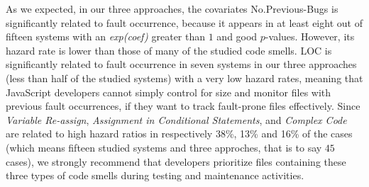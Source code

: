 As we expected, {\color{blue}in our three approaches,} the covariates No.Previous-Bugs is significantly related to fault occurrence, {\color{blue}because it appears in at least eight out of fifteen systems with an \textsl{exp(coef)} greater than $1$ and good $p$-values. However, its hazard rate is lower than those of many of the studied code smells. LOC is significantly related to fault occurrence in seven systems in our three approaches (less than half of the studied systems) with a very low hazard rates,} meaning that JavaScript developers cannot simply control for size and monitor files with previous fault occurrences, if they want to track fault-prone files effectively. Since \textsl{Variable Re-assign}, {\color{blue}\textsl{Assignment in Conditional Statements}, and \textsl{Complex Code} are related to high hazard ratios in respectively 38\%, 13\% and 16\% of the cases (which means fifteen studied systems and three approches, that is to say $45$ cases),} we strongly recommend that developers prioritize files containing these three types of code smells during testing and maintenance activities.


